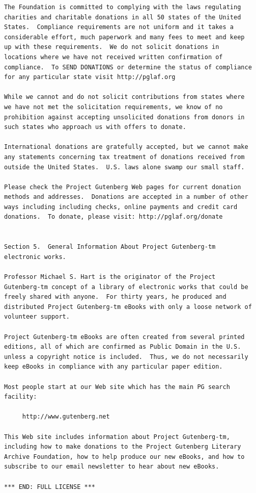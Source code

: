 \documentclass[a4paper,12pt]{book}[2004/02/16]
\theoremstyle{ilemma}
\theoremstyle{itheorem}
\theoremstyle{iother}
\theoremstyle{icorollary}
\theoremstyle{numcorollary}
\theoremstyle{idefinition}
\begin{document}
\begin{verbatim}
The Foundation is committed to complying with the laws regulating
charities and charitable donations in all 50 states of the United
States.  Compliance requirements are not uniform and it takes a
considerable effort, much paperwork and many fees to meet and keep
up with these requirements.  We do not solicit donations in
locations where we have not received written confirmation of
compliance.  To SEND DONATIONS or determine the status of compliance
for any particular state visit http://pglaf.org

While we cannot and do not solicit contributions from states where
we have not met the solicitation requirements, we know of no
prohibition against accepting unsolicited donations from donors in
such states who approach us with offers to donate.

International donations are gratefully accepted, but we cannot make
any statements concerning tax treatment of donations received from
outside the United States.  U.S. laws alone swamp our small staff.

Please check the Project Gutenberg Web pages for current donation
methods and addresses.  Donations are accepted in a number of other
ways including including checks, online payments and credit card
donations.  To donate, please visit: http://pglaf.org/donate


Section 5.  General Information About Project Gutenberg-tm
electronic works.

Professor Michael S. Hart is the originator of the Project
Gutenberg-tm concept of a library of electronic works that could be
freely shared with anyone.  For thirty years, he produced and
distributed Project Gutenberg-tm eBooks with only a loose network of
volunteer support.

Project Gutenberg-tm eBooks are often created from several printed
editions, all of which are confirmed as Public Domain in the U.S.
unless a copyright notice is included.  Thus, we do not necessarily
keep eBooks in compliance with any particular paper edition.

Most people start at our Web site which has the main PG search
facility:

     http://www.gutenberg.net

This Web site includes information about Project Gutenberg-tm,
including how to make donations to the Project Gutenberg Literary
Archive Foundation, how to help produce our new eBooks, and how to
subscribe to our email newsletter to hear about new eBooks.

*** END: FULL LICENSE ***

\end{verbatim}
\end{document}
